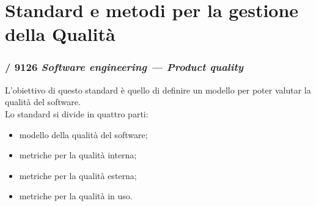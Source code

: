 \section{Standard e metodi per la gestione della Qualità}
  \subsubsection{/ 9126 \emph{Software engineering — Product quality}}
  L'obiettivo di questo standard è quello di definire un modello per poter valutar la qualità del software.\\
  Lo standard si divide in quattro parti:
  \begin{itemize}
    \item modello della qualità del software;
    \item metriche per la qualità interna;
    \item metriche per la qualità esterna;
    \item metriche per la qualità in uso.
  \end{itemize}
